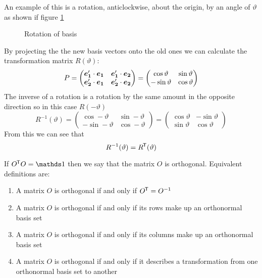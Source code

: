 \documentclass{article}
\begin{document}
    An example of this is a rotation, anticlockwise, about the origin, by an angle of \(\vartheta\) as shown if figure \ref{fig:rotation}
    \begin{figure}[ht]
        \centering
        \caption{Rotation of basis}
        \label{fig:rotation}
    \end{figure}
    By projecting the the new basis vectors onto the old ones we can calculate the transformation matrix \(R(\vartheta)\):
    \[
        P = 
        \begin{pmatrix}
            \bm{e_{1}}'\cdot \bm{e_{1}} & \bm{e_{1}}'\cdot \bm{e_{2}}\\
            \bm{e_{2}}'\cdot \bm{e_{1}} & \bm{e_{2}}'\cdot \bm{e_{2}}
        \end{pmatrix}
        =
        \begin{pmatrix}
            \cos\vartheta & \sin\vartheta\\
            -\sin\vartheta & \cos\vartheta
        \end{pmatrix}
    \]
    The inverse of a rotation is a rotation by the same amount in the opposite direction so in this case \(R(-\vartheta)\)
    \[
        R^{-1}(\vartheta)
        =
        \begin{pmatrix}
            \cos-\vartheta & \sin-\vartheta\\
            -\sin-\vartheta & \cos-\vartheta
        \end{pmatrix}
        =
        \begin{pmatrix}
            \cos\vartheta & -\sin\vartheta\\
            \sin\vartheta & \cos\vartheta
        \end{pmatrix}
    \]
    From this we can see that
    \[R^{-1}(\vartheta) = R^{\mkern-1.5mu\mathsf{T}}(\vartheta)\]
    
    If \(O\trans O = \ident\) then we say that the matrix \(O\) is orthogonal.
    Equivalent definitions are:
    \begin{enumerate}
        \item A matrix \(O\) is orthogonal if and only if \(O^{\mkern-1.5mu\mathsf{T}} = O^{-1}\)
        \item A matrix \(O\) is orthogonal if and only if its rows make up an orthonormal basis set
        \item A matrix \(O\) is orthogonal if and only if its columns make up an orthonormal basis set
        \item A matrix \(O\) is orthogonal if and only if it describes a transformation from one orthonormal basis set to another
    \end{enumerate}
\end{document}
